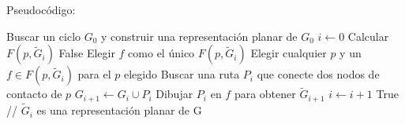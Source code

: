 Pseudocódigo:
\begin{algorithmic}[1]
    \State Buscar un ciclo $G_0$ y construir una representación planar de $G_0$
    \State $i \gets 0$
            \State Calcular $F(p, \tilde G_ i)$
                \State \Return False
            \EndIf
        \EndFor
            \State Elegir $f$ como el único $F(p, \tilde G_ i)$
        \Else
            \State Elegir cualquier $p$ y un $f \in F(p, \tilde G_ i)$ para el $p$ elegido
        \EndIf
        \State Buscar una ruta $P_i$ que conecte dos nodos de contacto de $p$
        \State $G_{i+1} \gets G_i \cup P_i$
        \State Dibujar $P_i$ en $f$ para obtener $\tilde  G_{i+1}$
        \State $i \gets i+1$
    \EndWhile
    \State \Return True // $\tilde G_i$ es una representación planar de G
\end{algorithmic}
